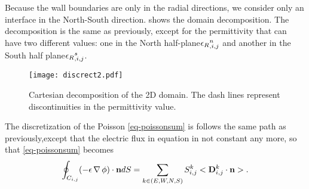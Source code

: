     Because the wall boundaries are only in the radial directions, we consider only an interface in the North-South direction.
     shows the domain decomposition.
    The decomposition is the same as previously, except for the permittivity that can have two different values\string: one in the North half-plane${\epsilon_{R}}_{, i,j}^n$ and another in the South half plane${\epsilon_{R}}_{, i,j}^s$.

    \begin{figure}[hbt]
      \centering
      \texttt{[image: discrect2.pdf]}
      \caption{Cartesian decomposition of the \ac{2D} domain. The dash lines represent discontinuities in the permittivity value.}
      \label{fig-decompo2}
    \end{figure}

    The discretization of the Poisson \cref{eq-poissonsum} is follows the same path as previously,except that the electric flux in equation in not constant any more, so that \cref{eq-poissonsum} becomes
    \begin{equation}
    \oint_{C_{i,j}} (-\epsilon \operatorname{{\mathbf \nabla}} \phi) \cdot {\mathbf n} dS = \sum_{k\in(E,W,N,S)} S^k_{i,j} <{\mathbf D}^k_{i,j} \cdot {\mathbf n}>.
    \end{equation}

